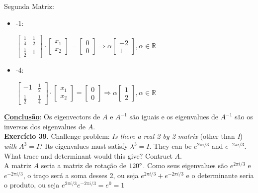 \documentclass[12pt]{article}
\newcommand{\real}{\mathbb{R}}
\newcommand{\mytitle}[1]{\textbf{\underline{#1}}}
\begin{document}
Segunda Matriz:
\begin{itemize}
\item -1:
  \begin{center}
    $
    \begin{bmatrix}
      \frac{1}{4} & \frac{1}{2} \\
      \frac{1}{2} & 1
    \end{bmatrix}\cdot
    \begin{bmatrix}
      x_1 \\ x_2
    \end{bmatrix}=
    \begin{bmatrix}
      0 \\ 0
    \end{bmatrix}\Rightarrow \alpha
    \begin{bmatrix}
      -2 \\ 1
    \end{bmatrix}, \alpha \in \real
    $
  \end{center}
\item -4:
  \begin{center}
    $
    \begin{bmatrix}
      -1 & \frac{1}{2} \\
      \frac{1}{2} & \frac{1}{4}
    \end{bmatrix}\cdot
    \begin{bmatrix}
      x_1 \\ x_2
    \end{bmatrix}=
    \begin{bmatrix}
      0 \\ 0
    \end{bmatrix}\Rightarrow \alpha
    \begin{bmatrix}
      1 \\ 2
    \end{bmatrix}, \alpha \in \real
    $
  \end{center}
\end{itemize}
\mytitle{Conclusão}: Os eigenvectors de $A$ e $A^{-1}$ são iguais e os eigenvalues de $A^{-1}$ são os inversos dos eigenvalues de $A$.\\
\textbf{Exercício 39}. Challenge problem: \textit{Is there a real 2 by 2 matrix} (other than \textit{I}) \textit{with} $A^3 = I$? Its eigenvalues must satisfy $\lambda^3 = I$. They can be $e^{2\pi i/3}$ and $e^{-2\pi i/3}$. What trace and determinant would this give? Contruct $A$.\\
A matriz $A$ seria a matriz de rotação de $120\degree$. Como seus eigenvalues são $e^{2\pi i/3}$ e $e^{-2\pi i/3}$, o traço será a soma desses 2, ou seja $e^{2\pi i/3}+e^{-2\pi i/3}$ e o determinante seria o produto, ou seja $e^{2\pi i/3}e^{-2\pi i/3}=e^0=1$\\
\end{document}
